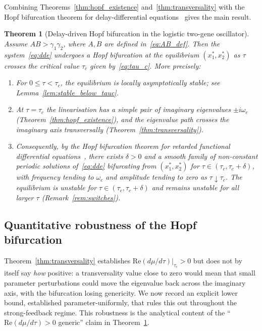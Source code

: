\documentclass[sn-mathphys,Numbered]{sn-jnl}
\theoremstyle{thmstyleone}
\newtheorem{theorem}{Theorem}
\theoremstyle{thmstyletwo}
\theoremstyle{thmstylethree}
\begin{document}
Combining Theorems~\ref{thm:hopf_existence} and~\ref{thm:transversality}
with the Hopf bifurcation theorem for delay-differential
equations~\cite[Theorem~11.1.1]{hale1993introduction} gives the main
result.

\begin{theorem}[Delay-driven Hopf bifurcation in the logistic two-gene oscillator]
\label{thm:hopf_main}
Assume $AB>\gamma_1\gamma_2$, where $A,B$ are
defined in~\eqref{eq:AB_def}.
Then the system~\eqref{eq:dde} undergoes a Hopf bifurcation at the
equilibrium $(x_1^*,x_2^*)$ as $\tau$ crosses the critical value
$\tau_c$ given by~\eqref{eq:tau_c}. More precisely:
\begin{enumerate}
  \item For $0\leq\tau<\tau_c$, the equilibrium is locally
        asymptotically stable; see
        Lemma~\ref{lem:stable_below_tauc}.
  \item At $\tau=\tau_c$ the linearisation has a simple pair of
        imaginary eigenvalues $\pm i\omega_c$
        (Theorem~\ref{thm:hopf_existence}),
        and the eigenvalue path crosses the imaginary axis
        transversally (Theorem~\ref{thm:transversality}).
  \item Consequently, by the Hopf bifurcation theorem for retarded
        functional differential
        equations~\cite[Theorem~11.1.1]{hale1993introduction}, there
        exists $\delta>0$ and a smooth family of non-constant periodic
        solutions of~\eqref{eq:dde} bifurcating from $(x_1^*,x_2^*)$ for
        $\tau\in(\tau_c,\tau_c+\delta)$, with frequency tending to
        $\omega_c$ and amplitude tending to zero as
        $\tau\downarrow\tau_c$. The equilibrium is unstable for
        $\tau\in(\tau_c,\tau_c+\delta)$ and remains unstable for all
        larger $\tau$ (Remark~\ref{rem:switches}).
\end{enumerate}
\end{theorem}

\subsection{Quantitative robustness of the Hopf bifurcation}
\label{sec:robustness}

Theorem~\ref{thm:transversality} establishes
$\mathrm{Re}(d\mu/d\tau)|_{\tau_c}>0$ but does not by itself say
\emph{how} positive: a transversality value close to zero would mean
that small parameter perturbations could move the eigenvalue
back across the imaginary axis, with the bifurcation losing
genericity. We now record an explicit lower bound, established
parameter-uniformly, that rules this out throughout the strong-feedback
regime. This robustness is the analytical content of the
``$\mathrm{Re}(d\mu/d\tau)>0$ generic'' claim in
Theorem~\ref{thm:hopf_main}.
\end{document}
